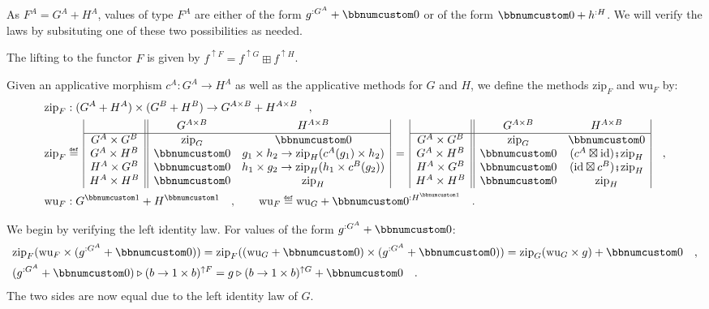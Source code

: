 As $F^{A}=G^{A}+H^{A}$, values of type $F^{A}$ are either of the
form $g^{:G^{A}}+\bbnum 0$ or of the form $\bbnum 0+h^{:H}$. We
will verify the laws by subsituting one of these two possibilities
as needed.

The lifting to the functor $F$ is given by $f^{\uparrow F}=f^{\uparrow G}\boxplus f^{\uparrow H}$.

Given an applicative morphism $c^{A}:G^{A}\rightarrow H^{A}$ as well
as the applicative methods for $G$ and $H$, we define the methods
$\text{zip}_{F}$ and $\text{wu}_{F}$ by:
\begin{align*}
 & \text{zip}_{F}:(G^{A}+H^{A})\times(G^{B}+H^{B})\rightarrow G^{A\times B}+H^{A\times B}\quad,\\
 & \text{zip}_{F}\triangleq\,\begin{array}{|c||cc|}
 & G^{A\times B} & H^{A\times B}\\
\hline G^{A}\times G^{B} & \text{zip}_{G} & \bbnum 0\\
G^{A}\times H^{B} & \bbnum 0 & g_{1}\times h_{2}\rightarrow\text{zip}_{H}(c^{A}(g_{1})\times h_{2})\\
H^{A}\times G^{B} & \bbnum 0 & h_{1}\times g_{2}\rightarrow\text{zip}_{H}(h_{1}\times c^{B}(g_{2}))\\
H^{A}\times H^{B} & \bbnum 0 & \text{zip}_{H}
\end{array}\,=\,\begin{array}{|c||cc|}
 & G^{A\times B} & H^{A\times B}\\
\hline G^{A}\times G^{B} & \text{zip}_{G} & \bbnum 0\\
G^{A}\times H^{B} & \bbnum 0 & (c^{A}\boxtimes\text{id})\bef\text{zip}_{H}\\
H^{A}\times G^{B} & \bbnum 0 & (\text{id}\boxtimes c^{B})\bef\text{zip}_{H}\\
H^{A}\times H^{B} & \bbnum 0 & \text{zip}_{H}
\end{array}\quad,\\
 & \text{wu}_{F}:G^{\bbnum 1}+H^{\bbnum 1}\quad,\quad\quad\text{wu}_{F}\triangleq\text{wu}_{G}+\bbnum 0^{:H^{\bbnum 1}}\quad.
\end{align*}

We begin by verifying the left identity law. For values of the form
$g^{:G^{A}}+\bbnum 0$:
\begin{align*}
 & \text{zip}_{F}(\text{wu}_{F}\times(g^{:G^{A}}+\bbnum 0))=\text{zip}_{F}((\text{wu}_{G}+\bbnum 0)\times(g^{:G^{A}}+\bbnum 0))=\text{zip}_{G}(\text{wu}_{G}\times g)+\bbnum 0\quad,\\
 & (g^{:G^{A}}+\bbnum 0)\triangleright(b\rightarrow1\times b)^{\uparrow F}=g\triangleright(b\rightarrow1\times b)^{\uparrow G}+\bbnum 0\quad.
\end{align*}
The two sides are now equal due to the left identity law of $G$.

